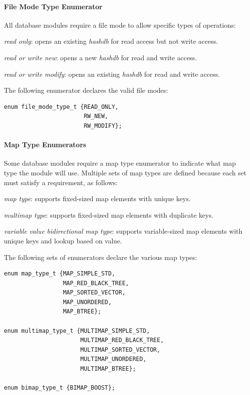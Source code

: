 \documentclass[12pt,twoside]{article}
\newcommand{\hdb}{\emph{hashdb}\xspace}
\begin{document}
\paragraph{File Mode Type Enumerator}
All database modules require a file mode to allow specific types of operations:
\begin{compactitem}
\item \emph{read only}: opens an existing \hdb for read access but not write access.
\item \emph{read or write new}: opens a new \hdb for read and write access.
\item \emph{read or write modify}: opens an existing \hdb for read and write access.
\end{compactitem}
The following enumerator declares the valid file modes:
\begin{small}
\begin{verbatim}
enum file_mode_type_t {READ_ONLY,
                       RW_NEW,
                       RW_MODIFY};
\end{verbatim}
\end{small}

\paragraph{Map Type Enumerators}
Some database modules require a map type enumerator to indicate what map type the module will use.
Multiple sets of map types are defined because each set must satisfy a requirement, as follows:
\begin{compactitem}
\item \emph{map type}: supports fixed-sized map elements with unique keys.
\item \emph{multimap type}: supports fixed-sized map elements with duplicate keys.
\item \emph{variable value bidirectional map type}: supports variable-sized map elements with unique keys
and lookup based on value.
\end{compactitem}
The following sets of enumerators declare the various map types:
\begin{small}
\begin{verbatim}
enum map_type_t {MAP_SIMPLE_STD,
                 MAP_RED_BLACK_TREE,
                 MAP_SORTED_VECTOR,
                 MAP_UNORDERED,
                 MAP_BTREE};

enum multimap_type_t {MULTIMAP_SIMPLE_STD,
                      MULTIMAP_RED_BLACK_TREE,
                      MULTIMAP_SORTED_VECTOR,
                      MULTIMAP_UNORDERED,
                      MULTIMAP_BTREE};

enum bimap_type_t {BIMAP_BOOST};
\end{verbatim}
\end{small}
\end{document}
